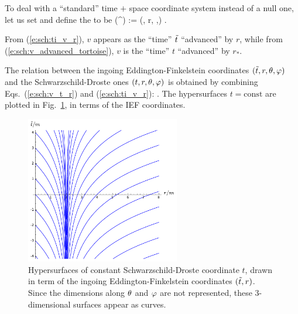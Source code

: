 To deal with a ``standard'' time $+$ space coordinate system instead of a null one, let us set
\be  \label{e:sch:ti_v_r}
     \iff {}
\ee
and define the 
to be
\be
    (^\alpha) := (\ti, r, \th,\ph) .
\ee

\begin{remark}
From (\ref{e:sch:ti_v_r}), $v$ appears as the ``time'' ${\tilde t}$ ``advanced'' by
$r$, while
from (\ref{e:sch:v_advanced_tortoise}), $v$ is the ``time'' $t$ ``advanced''
by $r_*$.
\end{remark}

The relation between the ingoing Eddington-Finkelstein coordinates
$({\tilde t}, r, \theta,\varphi)$
and the Schwarzschild-Droste ones $(t,r,\theta,\varphi)$ is obtained by combining
Eqs.~(\ref{e:sch:v_t_r}) and (\ref{e:sch:ti_v_r}):
\be \label{e:sch:ti_t_r}
      .
\ee
The hypersurfaces $t=\mathrm{const}$ are plotted in Fig.~\ref{f:sch:SD_slices},
in terms of the IEF coordinates.

\begin{figure}
\centerline{\includegraphics[width=0.6\textwidth]{sch_SD_slices.pdf}}
\caption[]{\label{f:sch:SD_slices} \footnotesize
Hypersurfaces of constant Schwarzschild-Droste coordinate $t$, drawn in term
of the ingoing Eddington-Finkelstein coordinates $({\tilde t},r)$. Since the dimensions
along $\theta$ and $\varphi$ are not represented, these 3-dimensional surfaces appear
as curves.}
\end{figure}

